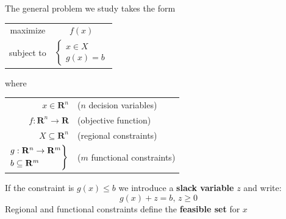 \documentclass[c]{beamer}
\begin{document}
\begin{frame}
  The general problem we study takes the form
  \begin{center}
  \begin{tabular}{cc}
    maximize & $f(x)$ \\
    subject to & $\begin{cases}x\in X\\g(x)=b\end{cases}$
  \end{tabular}
\end{center}
where
  \begin{center}
  \begin{tabular}{rl}
    $x \in \mathbf{R}^n$ & ($n$ decision variables)\\
    $f: \mathbf{R}^n \rightarrow \mathbf{R}$ & (objective function)\\
    $X \subseteq  \mathbf{R}^n$ & (regional constraints) \\
    $\begin{rcases}
      g: \mathbf{R}^n \rightarrow \mathbf{R}^m\\
      b \subseteq \mathbf{R}^m
    \end{rcases}$ & ($m$ functional constraints)\\
  \end{tabular}
\end{center}
If the constraint is $g(x)\leq b$ we introduce a {\bf slack variable} $z$ and write:
\[g(x)+z=b, \, z\geq0\]
Regional and functional constraints define the {\bf feasible set} for $x$

\end{frame}
\end{document}
